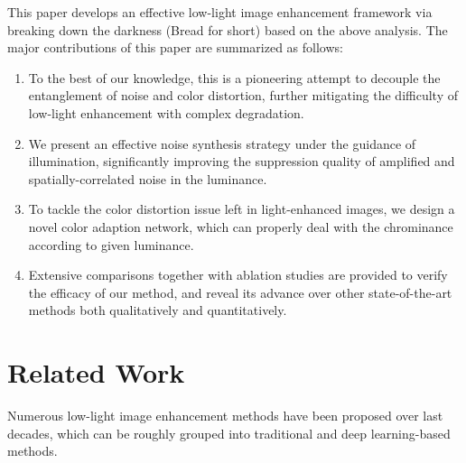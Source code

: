 \documentclass[10pt,twocolumn,letterpaper]{article}
\begin{document}
This paper develops an effective low-light image enhancement framework via breaking down the darkness (Bread for short) based on the above analysis. The major contributions of this paper are summarized as follows:
\begin{enumerate}
    \item To the best of our knowledge, this is a pioneering attempt to decouple the entanglement of noise and color distortion, further mitigating the difficulty of low-light enhancement with complex degradation.
    \item We present an effective noise synthesis strategy under the guidance of illumination, significantly improving the suppression quality of amplified and spatially-correlated noise in the luminance.
    \item To tackle the color distortion issue left in light-enhanced images, we design a novel color adaption network, which can properly deal with the chrominance according to given luminance.
    \item Extensive comparisons together with ablation studies are provided to verify the efficacy of our method, and reveal its advance over other state-of-the-art methods both qualitatively and quantitatively. 
\end{enumerate}


























\section{Related Work}
Numerous low-light image enhancement methods have been proposed over last decades,  which can be roughly grouped into traditional and deep learning-based methods.
\end{document}
